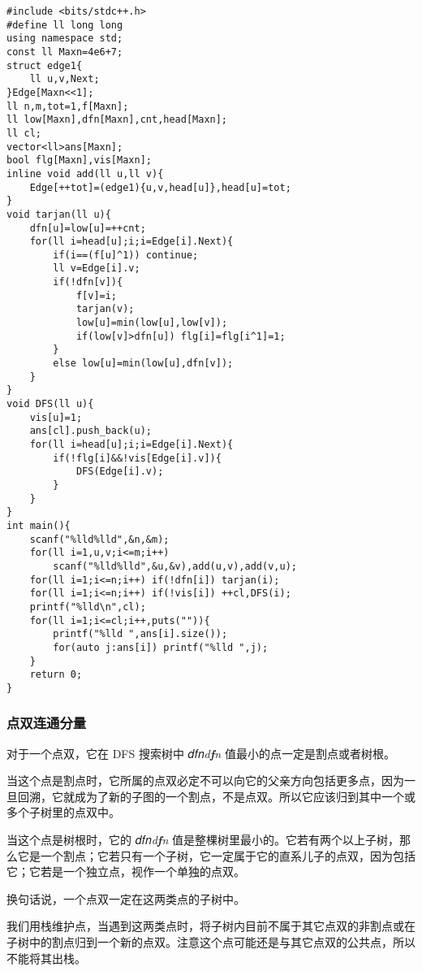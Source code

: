 \documentclass[]{article}
\begin{document}
\begin{verbatim}
#include <bits/stdc++.h>
#define ll long long
using namespace std;
const ll Maxn=4e6+7;
struct edge1{
    ll u,v,Next;
}Edge[Maxn<<1];
ll n,m,tot=1,f[Maxn];
ll low[Maxn],dfn[Maxn],cnt,head[Maxn];
ll cl;
vector<ll>ans[Maxn];
bool flg[Maxn],vis[Maxn];
inline void add(ll u,ll v){
    Edge[++tot]=(edge1){u,v,head[u]},head[u]=tot;
}
void tarjan(ll u){
    dfn[u]=low[u]=++cnt;
    for(ll i=head[u];i;i=Edge[i].Next){
        if(i==(f[u]^1)) continue;
        ll v=Edge[i].v;
        if(!dfn[v]){
            f[v]=i;
            tarjan(v);
            low[u]=min(low[u],low[v]);
            if(low[v]>dfn[u]) flg[i]=flg[i^1]=1;
        }
        else low[u]=min(low[u],dfn[v]);
    }
}
void DFS(ll u){
    vis[u]=1;
    ans[cl].push_back(u);
    for(ll i=head[u];i;i=Edge[i].Next){
        if(!flg[i]&&!vis[Edge[i].v]){
            DFS(Edge[i].v);
        }
    }
}
int main(){
    scanf("%lld%lld",&n,&m);
    for(ll i=1,u,v;i<=m;i++) 
        scanf("%lld%lld",&u,&v),add(u,v),add(v,u); 
    for(ll i=1;i<=n;i++) if(!dfn[i]) tarjan(i);
    for(ll i=1;i<=n;i++) if(!vis[i]) ++cl,DFS(i);
    printf("%lld\n",cl);
    for(ll i=1;i<=cl;i++,puts("")){
        printf("%lld ",ans[i].size());
        for(auto j:ans[i]) printf("%lld ",j);
    }
    return 0;
}
\end{verbatim}

\hypertarget{ux70b9ux53ccux8fdeux901aux5206ux91cf}{%
\subsubsection{点双连通分量}\label{ux70b9ux53ccux8fdeux901aux5206ux91cf}}

对于一个点双，它在 DFS 搜索树中 𝑑𝑓𝑛\emph{d\textbf{f}n}
值最小的点一定是割点或者树根。

当这个点是割点时，它所属的点双必定不可以向它的父亲方向包括更多点，因为一旦回溯，它就成为了新的子图的一个割点，不是点双。所以它应该归到其中一个或多个子树里的点双中。

当这个点是树根时，它的 𝑑𝑓𝑛\emph{d\textbf{f}n}
值是整棵树里最小的。它若有两个以上子树，那么它是一个割点；它若只有一个子树，它一定属于它的直系儿子的点双，因为包括它；它若是一个独立点，视作一个单独的点双。

换句话说，一个点双一定在这两类点的子树中。

我们用栈维护点，当遇到这两类点时，将子树内目前不属于其它点双的非割点或在子树中的割点归到一个新的点双。注意这个点可能还是与其它点双的公共点，所以不能将其出栈。
\end{document}
